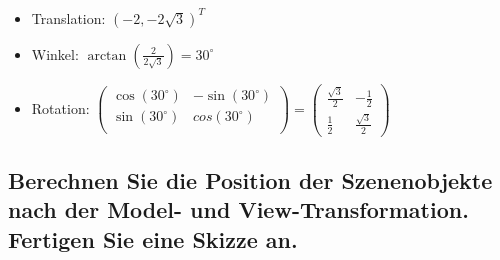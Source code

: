 \documentclass[a4paper,10pt,DIV=14]{scrartcl}
\newcommand{\dg}[1]{#1^\circ}
\begin{document}
\begin{itemize}
	\item Translation: $ \left(-2, -2\sqrt{3}\right)^T $
	\item Winkel: $ \arctan\left(\frac{2}{2\sqrt{3}}\right) = \dg{30} $
	\item Rotation: $ \begin{pmatrix}	\cos(\dg{30}) & -\sin(\dg{30}) \\ \sin(\dg{30}) & cos(\dg{30}) \\ \end{pmatrix}
	= \begin{pmatrix} \frac{\sqrt{3}}{2} & -\frac{1}{2} \\ \frac{1}{2} & \frac{\sqrt{3}}{2} \end{pmatrix} $
\end{itemize}


\subsection{Berechnen Sie die Position der Szenenobjekte nach der Model- und View-Trans\-for\-ma\-tion. Fertigen Sie eine Skizze an.}
\end{document}
